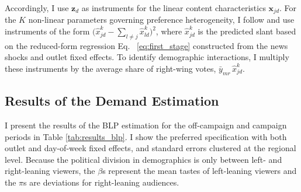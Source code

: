 \documentclass[12pt]{article}
\begin{document}
	
		
	
	Accordingly, I use
	$\bm{z}_{d}$
	as instruments for the linear content characteristics $ \bm{x}_{jd}$.  For the $K$ non-linear parameters governing preference heterogeneity, I follow \citet{gandhi2019measuring} and use instruments of the form 
	$\bigl(\hat{x}_{jd}^k-\sum_{l\neq j}\hat{x}_{ld}^k\bigr)^2$,
	where $\hat{x}_{jd}^k$ is the predicted slant based on the reduced-form regression Eq. ~\eqref{eq:first_stage} constructed from the news shocks and outlet fixed effects. 	To identify demographic interactions, I multiply these instruments by the average share of right-wing votes, $\bar y_{mr}\,\hat{x}_{jd}^k$.



	\subsection{Results of the Demand Estimation}
	
	\label{sec:results}
	
	
I present the results of the BLP estimation for the off-campaign and campaign periods in Table \ref{tab:results_blp}. I show the preferred specification with both outlet and day-of-week fixed effects, and standard errors clustered at the regional level. Because the political division in demographics is only between left- and right-leaning viewers, the \(\beta\)s represent the mean tastes of left-leaning viewers and the \(\pi\)s are deviations for right-leaning audiences.
\end{document}
